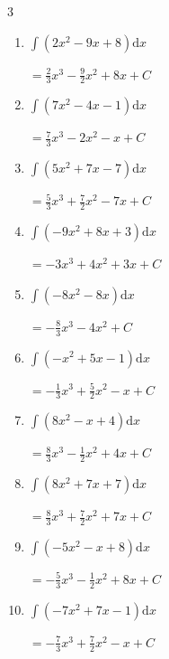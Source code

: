 \begin{multicols}{3}
\begin{enumerate}
  \item $\displaystyle \int \left( 2x^{2}-9x+8 \right) \mathrm{d}x$

        $\displaystyle =\frac{2}{3}x^{3}-\frac{9}{2}x^{2}+8x+ C$

  \item $\displaystyle \int \left( 7x^{2}-4x-1 \right) \mathrm{d}x$

        $\displaystyle =\frac{7}{3}x^{3}-2x^{2}-x+ C$

  \item $\displaystyle \int \left( 5x^{2}+7x-7 \right) \mathrm{d}x$

        $\displaystyle =\frac{5}{3}x^{3}+\frac{7}{2}x^{2}-7x+ C$

  \item $\displaystyle \int \left( -9x^{2}+8x+3 \right) \mathrm{d}x$

        $\displaystyle =-3x^{3}+4x^{2}+3x+ C$

  \item $\displaystyle \int \left( -8x^{2}-8x \right) \mathrm{d}x$

        $\displaystyle =-\frac{8}{3}x^{3}-4x^{2}+ C$

  \item $\displaystyle \int \left( -x^{2}+5x-1 \right) \mathrm{d}x$

        $\displaystyle =-\frac{1}{3}x^{3}+\frac{5}{2}x^{2}-x+ C$

  \item $\displaystyle \int \left( 8x^{2}-x+4 \right) \mathrm{d}x$

        $\displaystyle =\frac{8}{3}x^{3}-\frac{1}{2}x^{2}+4x+ C$

\columnbreak %

\resetques

  \item $\displaystyle \int \left( 8x^{2}+7x+7 \right) \mathrm{d}x$

        $\displaystyle =\frac{8}{3}x^{3}+\frac{7}{2}x^{2}+7x+ C$

  \item $\displaystyle \int \left( -5x^{2}-x+8 \right) \mathrm{d}x$

        $\displaystyle =-\frac{5}{3}x^{3}-\frac{1}{2}x^{2}+8x+ C$

  \item $\displaystyle \int \left( -7x^{2}+7x-1 \right) \mathrm{d}x$

        $\displaystyle =-\frac{7}{3}x^{3}+\frac{7}{2}x^{2}-x+ C$


\end{enumerate}
\end{multicols}
